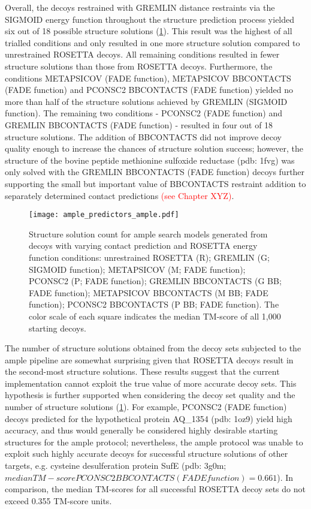 Overall, the decoys restrained with GREMLIN distance restraints via the SIGMOID energy function throughout the structure prediction process yielded six out of 18 possible structure solutions (\cref{fig:ample_predictor_ample}). This result was the highest of all trialled conditions and only resulted in one more structure solution compared to unrestrained ROSETTA decoys. All remaining conditions resulted in fewer structure solutions than those from ROSETTA decoys. Furthermore, the conditions METAPSICOV (FADE function), METAPSICOV BBCONTACTS (FADE function) and PCONSC2 BBCONTACTS (FADE function) yielded no more than half of the structure solutions achieved by GREMLIN (SIGMOID function). The remaining two conditions - PCONSC2 (FADE function) and GREMLIN BBCONTACTS (FADE function) - resulted in four out of 18 structure solutions. The addition of BBCONTACTS did not improve decoy quality enough to increase the chances of structure solution success; however, the structure of the bovine peptide methionine sulfoxide reductase (\gls{pdb}: 1fvg) was only solved with the GREMLIN BBCONTACTS (FADE function) decoys further supporting the small but important value of BBCONTACTS restraint addition to separately determined contact predictions \textcolor{red}{(see Chapter XYZ)}.

\begin{figure}[H]
    \centering
    \texttt{[image: ample\_predictors\_ample.pdf]}
    \caption{Structure solution count for \gls{ample} search models generated from decoys with varying contact prediction and ROSETTA energy function conditions: unrestrained ROSETTA (R); GREMLIN (G; SIGMOID function); METAPSICOV (M; FADE function); PCONSC2  (P; FADE function); GREMLIN BBCONTACTS (G BB; FADE function); METAPSICOV BBCONTACTS (M BB; FADE function); PCONSC2 BBCONTACTS (P BB; FADE function). The color scale of each square indicates the median TM-score of all 1,000 starting decoys.}
    \label{fig:ample_predictor_ample}
\end{figure}

The number of structure solutions obtained from the decoy sets subjected to the \gls{ample} pipeline are somewhat surprising given that ROSETTA decoys result in the second-most structure solutions. These results suggest that the current implementation cannot exploit the true value of more accurate decoy sets. This hypothesis is further supported when considering the decoy set quality and the number of structure solutions (\cref{fig:ample_predictor_ample}). For example, PCONSC2 (FADE function) decoys predicted for the hypothetical protein AQ\_1354 (\gls{pdb}: 1oz9) yield high accuracy, and thus would generally be considered highly desirable starting structures for the \gls{ample} protocol; nevertheless, the \gls{ample} protocol was unable to exploit such highly accurate decoys for successful structure solutions of other targets, e.g. cysteine desulferation protein SufE (\gls{pdb}: 3g0m; $median TM-score PCONSC2 BBCONTACTS (FADE function)=0.661$). In comparison, the median TM-scores for all successful ROSETTA decoy sets do not exceed 0.355 TM-score units.

